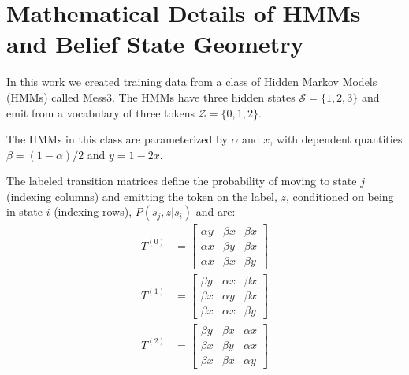 \documentclass{article}
\theoremstyle{plain}
\theoremstyle{definition}
\theoremstyle{remark}
\newcommand{\SSet}{\mathcal{S}}
\newcommand{\Abet}{\mathcal{Z}}
\begin{document}





\newpage
\appendix
\onecolumn

\appendix
\setcounter{figure}{0}
\renewcommand{\thefigure}{A\arabic{figure}}

\section{Mathematical Details of HMMs and Belief State Geometry}
\label{apx:math}

In this work we created training data from a class of Hidden Markov Models (HMMs) called Mess3. The HMMs have three hidden states 
 $\SSet = \{ 1, 2, 3\}$
 and emit from a vocabulary of three tokens $\Abet = \{ 0, 1, 2 \}$.
 
 The HMMs in this class are parameterized by
 $\alpha$ and $x$,
 with dependent quantities
 $\beta = (1-\alpha)/2$ and $y = 1-2x$.
 
 The labeled transition matrices define the probability of moving to state $j$ (indexing columns) and emitting the token on the label, $z$, conditioned on being in state $i$ (indexing rows), $P(s_j, z|s_i)$ and are:
 \begin{align}
 T^{(0)} &= 
 \begin{bmatrix}
 	\alpha y & \beta x & \beta x \\
 	\alpha x & \beta y & \beta x \\
 	\alpha x & \beta x & \beta y
 \end{bmatrix}
 \\
  T^{(1)} &= 
 \begin{bmatrix}
 	\beta y & \alpha x & \beta x \\
 	\beta x & \alpha y & \beta x \\
 	\beta x & \alpha x & \beta y
 \end{bmatrix}
 \\
   T^{(2)} &= 
 \begin{bmatrix}
 	\beta y & \beta x & \alpha x \\
 	\beta x & \beta y & \alpha x \\
 	\beta x & \beta x & \alpha y
 \end{bmatrix}
 \end{align}
\end{document}
